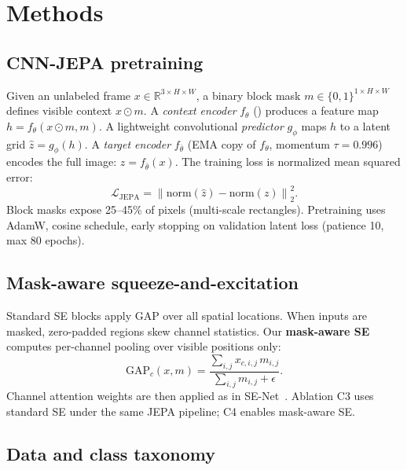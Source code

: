 \section{Methods}
\label{sec:methods}

\subsection{CNN-JEPA pretraining}
\label{sec:jepa}

Given an unlabeled frame $x \in \mathbb{R}^{3\times H \times W}$, a binary block mask $m \in \{0,1\}^{1\times H \times W}$ defines visible context $x \odot m$.
A \emph{context encoder} $f_\theta$ (\backbone{}) produces a feature map $h = f_\theta(x \odot m, m)$.
A lightweight convolutional \emph{predictor} $g_\phi$ maps $h$ to a latent grid $\hat{z} = g_\phi(h)$.
A \emph{target encoder} $f_{\bar{\theta}}$ (EMA copy of $f_\theta$, momentum $\tau=0.996$) encodes the full image: $z = f_{\bar{\theta}}(x)$.
The training loss is normalized mean squared error:
\begin{equation}
\mathcal{L}_{\mathrm{JEPA}} = \left\| \mathrm{norm}(\hat{z}) - \mathrm{norm}(z) \right\|_2^2 .
\end{equation}
Block masks expose 25--45\% of pixels (multi-scale rectangles).
Pretraining uses AdamW, cosine schedule, early stopping on validation latent loss (patience 10, max 80 epochs).

\subsection{Mask-aware squeeze-and-excitation}
\label{sec:maskse}

Standard SE blocks apply GAP over all spatial locations.
When inputs are masked, zero-padded regions skew channel statistics.
Our \textbf{mask-aware SE} computes per-channel pooling over visible positions only:
\begin{equation}
\mathrm{GAP}_c(x,m) = \frac{\sum_{i,j} x_{c,i,j}\, m_{i,j}}{\sum_{i,j} m_{i,j} + \epsilon}.
\end{equation}
Channel attention weights are then applied as in SE-Net~\cite{hu2018senet}.
Ablation C3 uses standard SE under the same JEPA pipeline; C4 enables mask-aware SE.

\subsection{Data and class taxonomy}
\label{sec:data}

